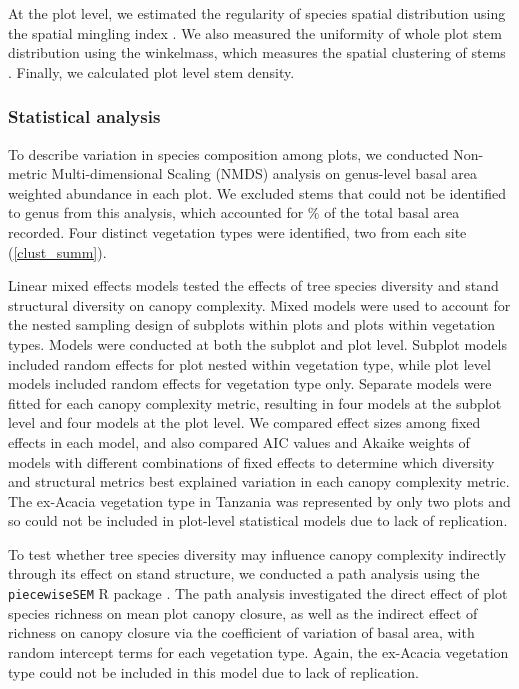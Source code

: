 \documentclass[11pt,a4paper]{article}
\begin{document}
At the plot level, we estimated the regularity of species spatial distribution using the spatial mingling index \citep{Gadow2002}. We also measured the uniformity of whole plot stem distribution using the winkelmass, which measures the spatial clustering of stems \citep{Gadow2002}. Finally, we calculated plot level stem density.

\subsubsection{Statistical analysis}

To describe variation in species composition among plots, we conducted Non-metric Multi-dimensional Scaling (NMDS) analysis on genus-level basal area weighted abundance in each plot. We excluded stems that could not be identified to genus from this analysis, which accounted for \perIndet{}\% of the total basal area recorded. Four distinct vegetation types were identified, two from each site (\autoref{clust_summ}). 

Linear mixed effects models tested the effects of tree species diversity and stand structural diversity on canopy complexity. Mixed models were used to account for the nested sampling design of subplots within plots and plots within vegetation types. Models were conducted at both the subplot and plot level. Subplot models included random effects for plot nested within vegetation type, while plot level models included random effects for vegetation type only. Separate models were fitted for each canopy complexity metric, resulting in four models at the subplot level and four models at the plot level. We compared effect sizes among fixed effects in each model, and also compared AIC values and Akaike weights of models with different combinations of fixed effects to determine which diversity and structural metrics best explained variation in each canopy complexity metric. The ex-Acacia vegetation type in Tanzania was represented by only two plots and so could not be included in plot-level statistical models due to lack of replication. 

To test whether tree species diversity may influence canopy complexity indirectly through its effect on stand structure, we conducted a path analysis using the \texttt{piecewiseSEM} R package \citep{piecewiseSEM}. The path analysis investigated the direct effect of plot species richness on mean plot canopy closure, as well as the indirect effect of richness on canopy closure via the coefficient of variation of basal area, with random intercept terms for each vegetation type. Again, the ex-Acacia vegetation type could not be included in this model due to lack of replication.
\end{document}
